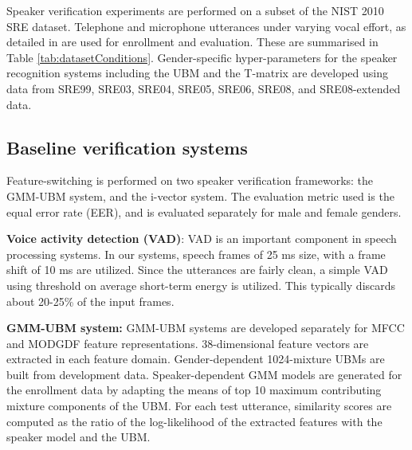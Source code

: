 \documentclass[preprint,12pt,5p]{elsarticle}
\begin{document}
\begin{table*}[t]
\centering
\caption{NIST 2010 conditions used in the evaluation}
\label{tab:datasetConditions}
\end{table*}

Speaker verification experiments are performed on a subset of
the NIST 2010 SRE dataset. Telephone and microphone utterances under varying 
vocal effort, as detailed in \cite{nist2010SRE} are used for enrollment and 
evaluation. These are summarised in Table \ref{tab:datasetConditions}. 
Gender-specific hyper-parameters for the speaker recognition systems including 
the UBM and the T-matrix are developed using data 
from SRE99, SRE03, SRE04, SRE05, SRE06, SRE08, and SRE08-extended data.


\subsection{Baseline verification systems}
\label{subsec:baseline}

Feature-switching is performed on two speaker verification frameworks: the GMM-UBM system, 
and the i-vector system. The evaluation
metric used is the equal error rate (EER), and is evaluated separately
for male and female genders.


\textbf{Voice activity detection (VAD)}: VAD is an important component in speech
processing systems. In our systems, speech frames of 25 ms size, with a frame
shift of 10 ms are utilized. Since the utterances are fairly clean, a simple VAD
using threshold on average short-term energy is utilized. This typically
discards about 20-25\% of the input frames.

\textbf{GMM-UBM system:} GMM-UBM systems are developed separately for 
MFCC and MODGDF feature representations. 38-dimensional feature vectors are 
extracted in each feature domain. Gender-dependent 1024-mixture UBMs are built 
from development data.  Speaker-dependent GMM models are generated for the 
enrollment data by adapting the means of top 10 maximum contributing mixture 
components of the UBM. For each test utterance, similarity scores are computed 
as the ratio of the log-likelihood of the extracted features with the speaker
model and the UBM.
\end{document}

